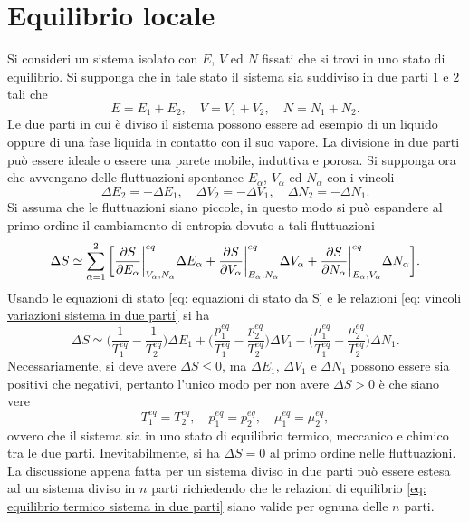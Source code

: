 \section{Equilibrio locale}
Si consideri un sistema isolato con $E$, $V$ ed $N$ fissati che si trovi in uno stato di equilibrio. Si supponga che in tale stato il sistema sia suddiviso in due parti $1$ e $2$ tali che 
\begin{equation}
    E = E_1 + E_2,\quad V = V_1 + V_2,\quad N = N_1 + N_2.
\end{equation}
Le due parti in cui è diviso il sistema possono essere ad esempio di un liquido oppure di una fase liquida in contatto con il suo vapore. La divisione in due parti può essere ideale o essere una parete mobile, induttiva e porosa. Si supponga ora che avvengano delle fluttuazioni spontanee $E_\alpha$, $V_\alpha$ ed $N_\alpha$ con i vincoli
\begin{equation}
\label{eq: vincoli variazioni sistema in due parti}
    \Delta E_2 = -\Delta E_1,\quad \Delta V_2 = -\Delta V_1,\quad \Delta N_2 = -\Delta N_1.
\end{equation}
Si assuma che le fluttuazioni siano piccole, in questo modo si può espandere al primo ordine il cambiamento di entropia dovuto a tali fluttuazioni
\begin{equation}
    \Delta S \simeq \sum_{\alpha = 1}^2\bigg[\frac{\partial S}{\partial E_\alpha}\bigg|_{V_\alpha,N_\alpha}^{eq}\Delta E_\alpha + \frac{\partial S}{\partial V_\alpha}\bigg|_{E_\alpha,N_\alpha}^{eq}\Delta V_\alpha + \frac{\partial S}{\partial N_\alpha}\bigg|_{E_\alpha,V_\alpha}^{eq}\Delta N_\alpha\bigg].
\end{equation}
Usando le equazioni di stato \eqref{eq: equazioni di stato da S} e le relazioni \eqref{eq: vincoli variazioni sistema in due parti} si ha
\begin{equation}
    \Delta S \simeq \bigg(\frac{1}{T_1^{eq}} - \frac{1}{T_2^{eq}}\bigg)\Delta E_1 + \bigg(\frac{p_1^{eq}}{T_1^{eq}} - \frac{p_2^{eq}}{T_2^{eq}}\bigg)\Delta V_1 - \bigg(\frac{\mu_1^{eq}}{T_1^{eq}} - \frac{\mu_2^{eq}}{T_2^{eq}}\bigg)\Delta N_1.
\end{equation}
Necessariamente, si deve avere $\Delta S \le 0$, ma $\Delta E_1$, $\Delta V_1$ e $\Delta N_1$ possono essere sia positivi che negativi, pertanto l'unico modo per non avere $\Delta S > 0$ è che siano vere
\begin{equation}
\label{eq: equilibrio termico sistema in due parti}
    T_1^{eq} = T_2^{{eq}},\quad p_1^{eq} = p_2^{eq},\quad \mu_1^{eq} = \mu_2^{eq},
\end{equation}
ovvero che il sistema sia in uno stato di equilibrio termico, meccanico e chimico tra le due parti. Inevitabilmente, si ha $\Delta S = 0$ al primo ordine nelle fluttuazioni. La discussione appena fatta per un sistema diviso in due parti può essere estesa ad un sistema diviso in $n$ parti richiedendo che le relazioni di equilibrio \eqref{eq: equilibrio termico sistema in due parti} siano valide per ognuna delle $n$ parti.

